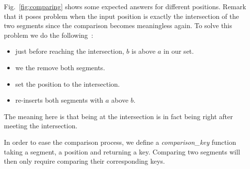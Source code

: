 \documentclass[a4paper, 11pt]{article}
\begin{document}
Fig.~\ref{fig:comparing} shows some expected answers for different positions.
Remark that it poses problem when the input position is exactly the intersection
of the two segments since the comparison becomes meaningless again.
To solve this problem we do the following~:
\begin{itemize}
  \item just before reaching the intersection, $b$ is above $a$ in our set.
  \item we the remove both segments.
  \item set the position to the intersection.
  \item re-inserts both segments with $a$ above $b$.
\end{itemize}

The meaning here is that being at the intersection is in fact being
right after meeting the intersection.

In order to ease the comparison process, we define a \emph{comparison_key} function
taking a segment, a position and returning a key. Comparing two segments will then
only require comparing their corresponding keys.
\end{document}
